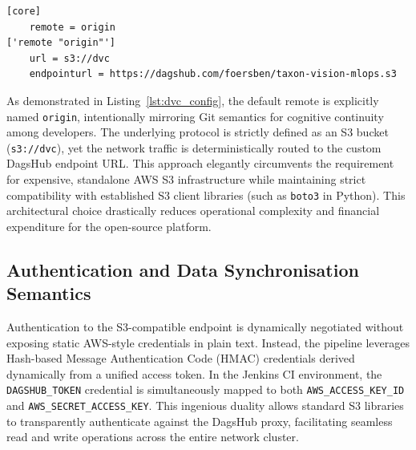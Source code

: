 \begin{listing}[H]
\begin{verbatim}
[core]
    remote = origin
['remote "origin"']
    url = s3://dvc
    endpointurl = https://dagshub.com/foersben/taxon-vision-mlops.s3
\end{verbatim}
\caption{S3 Remote configuration defined in \texttt{.dvc/config}.}
\label{lst:dvc_config}
\end{listing}

As demonstrated in Listing~\ref{lst:dvc_config}, the default remote is explicitly named \texttt{origin}, intentionally mirroring Git semantics for cognitive continuity among developers. The underlying protocol is strictly defined as an S3 bucket (\texttt{s3://dvc}), yet the network traffic is deterministically routed to the custom DagsHub endpoint URL. This approach elegantly circumvents the requirement for expensive, standalone AWS S3 infrastructure while maintaining strict compatibility with established S3 client libraries (such as \texttt{boto3} in Python). This architectural choice drastically reduces operational complexity and financial expenditure for the open-source platform.

\subsection{Authentication and Data Synchronisation Semantics}
Authentication to the S3-compatible endpoint is dynamically negotiated without exposing static AWS-style credentials in plain text. Instead, the pipeline leverages Hash-based Message Authentication Code (HMAC) credentials derived dynamically from a unified access token. In the Jenkins CI environment, the \texttt{DAGSHUB\_TOKEN} credential is simultaneously mapped to both \texttt{AWS\_ACCESS\_KEY\_ID} and \texttt{AWS\_SECRET\_ACCESS\_KEY}. This ingenious duality allows standard S3 libraries to transparently authenticate against the DagsHub proxy, facilitating seamless read and write operations across the entire network cluster.

